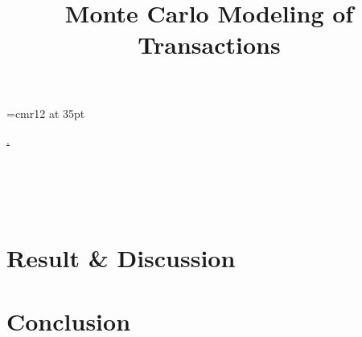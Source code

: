 
\font\myfont=cmr12 at 35pt
\title{\textbf{{\myfont Monte Carlo Modeling of Transactions}}}

\mnfrontpage


\pagestyle{fancy}
\fancyhf{}
\fancyfoot[CE,LO]{\leftmark}

\renewcommand{\headrulewidth}{2pt}
\renewcommand{\footrulewidth}{1pt}

\tableofcontents

                                              \href{https://soundcloud.com/atomic_horizon/halo-theme-song}{.}
\\
\\\\\\\\


\pagebreak










\pagebreak
\section{Result \& Discussion}




%

\pagebreak
\section{Conclusion}


\pagebreak
\printbibliography

% 






